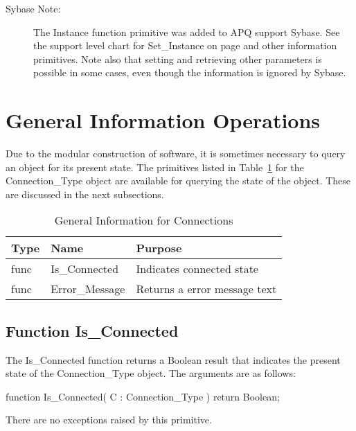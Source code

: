 \documentclass[english,letterpaper]{book}
\begin{document}
\begin{description}
\item [Sybase Note:]The Instance function primitive was added to APQ support Sybase.
   See the support level chart for Set\_Instance on page \pageref{Set_Instance Support Chart}
   and other information primitives. Note also that setting and retrieving
   other parameters is possible in some cases, even though the information
   is ignored by Sybase.
\end{description}

\section{General Information Operations}

Due to the modular construction of software, it is sometimes necessary
to query an object for its present state. The primitives listed in Table~\ref{t:gifc}
for the Connection\_Type object are available for querying the state
of the object. These are discussed in the next subsections.

\begin{table}
   \begin{center}
      \begin{tabular}{lll}
         Type  &  Name              &  Purpose\\
         \hline 
         func  &  Is\_Connected     &  Indicates connected state\\
         func  &  Error\_Message    &  Returns a error message text\\
      \end{tabular}
   \end{center}
   \caption{General Information for Connections}\label{t:gifc}
\end{table}

\subsection{Function Is\_Connected}

The Is\_Connected function returns a Boolean result that indicates
the present state of the Connection\_Type object. The arguments are
as follows:

\begin{Code}
function Is_Connected(
   C : Connection_Type
) return Boolean;
\end{Code}

There are no exceptions raised by this primitive.
\end{document}
